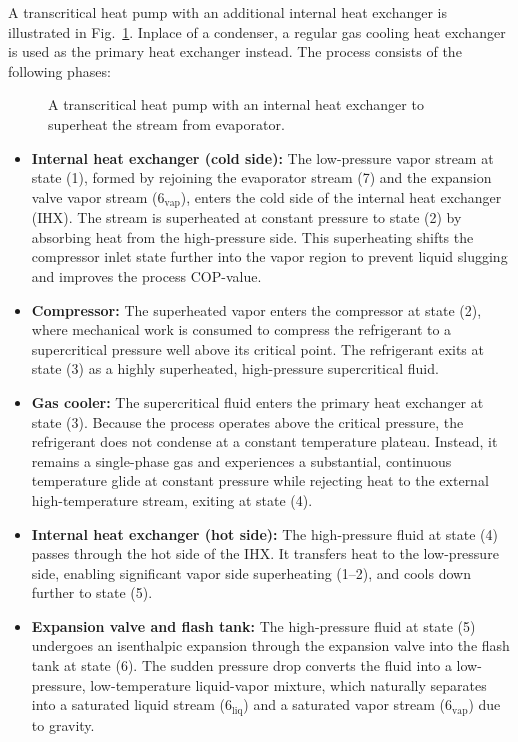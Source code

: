 A transcritical heat pump with an additional internal heat exchanger is illustrated in Fig.~\ref{fig:heat-pump-transcritical}. Inplace of a condenser, a regular gas cooling heat exchanger is used as the primary heat exchanger instead. The process consists of the following phases:
\begin{figure}[!htb]
    \centering
    
    \caption{A transcritical heat pump with an internal heat exchanger to superheat the stream from evaporator.}
    \label{fig:heat-pump-transcritical}
\end{figure}
\begin{itemize}
    \item[1--2] \textbf{Internal heat exchanger (cold side):} The low-pressure vapor stream at state (1), formed by rejoining the evaporator stream (7) and the expansion valve vapor stream ($6_\text{vap}$), enters the cold side of the internal heat exchanger (IHX). The stream is superheated at constant pressure to state (2) by absorbing heat from the high-pressure side. This superheating shifts the compressor inlet state further into the vapor region to prevent liquid slugging and improves the process COP-value.

    \item[2--3] \textbf{Compressor:} The superheated vapor enters the compressor at state (2), where mechanical work is consumed to compress the refrigerant to a supercritical pressure well above its critical point. The refrigerant exits at state (3) as a highly superheated, high-pressure supercritical fluid.

    \item[3--4] \textbf{Gas cooler:} The supercritical fluid enters the primary heat exchanger at state (3). Because the process operates above the critical pressure, the refrigerant does not condense at a constant temperature plateau. Instead, it remains a single-phase gas and experiences a substantial, continuous temperature glide at constant pressure while rejecting heat to the external high-temperature stream, exiting at state (4).

    \item[4--5] \textbf{Internal heat exchanger (hot side):} The high-pressure fluid at state (4) passes through the hot side of the IHX. It transfers heat to the low-pressure side, enabling significant vapor side superheating (1--2), and cools down further to state (5).

    \item[5--6] \textbf{Expansion valve and flash tank:} The high-pressure fluid at state (5) undergoes an isenthalpic expansion through the expansion valve into the flash tank at state (6). The sudden pressure drop converts the fluid into a low-pressure, low-temperature liquid-vapor mixture, which naturally separates into a saturated liquid stream ($6_\text{liq}$) and a saturated vapor stream ($6_\text{vap}$) due to gravity.


\end{itemize}

